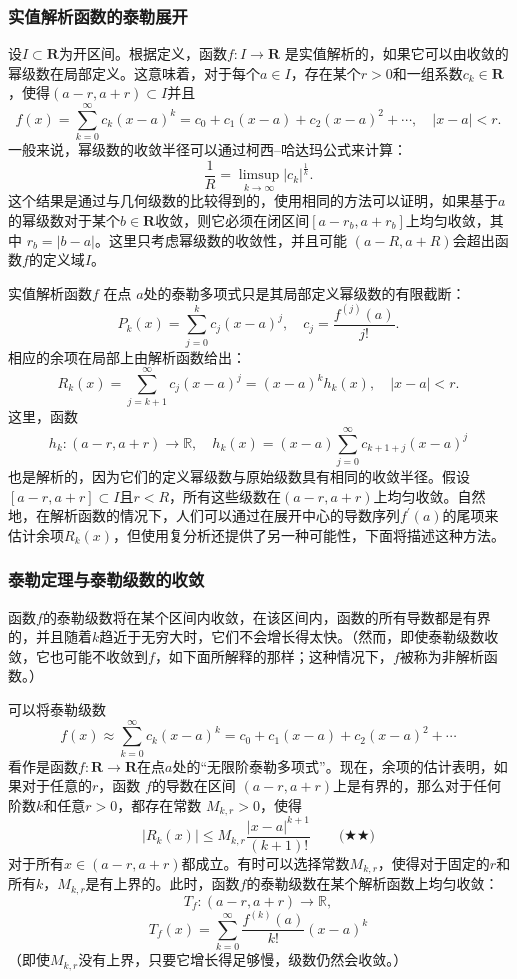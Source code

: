 \subsubsection{实值解析函数的泰勒展开}  
设\( I \subset \mathbf{R} \)为开区间。根据定义，函数\( f : I \to \mathbf{R} \) 是实值解析的，如果它可以由收敛的幂级数在局部定义。这意味着，对于每个\( a \in I \)，存在某个\( r > 0 \)和一组系数\( c_k \in \mathbf{R}\)，使得\( (a - r, a + r) \subset I \)并且
\[
f(x) = \sum_{k=0}^{\infty} c_k (x - a)^k = c_0 + c_1 (x - a) + c_2 (x - a)^2 + \cdots, \quad |x - a| < r.~
\]
一般来说，幂级数的收敛半径可以通过柯西–哈达玛公式来计算：
\[
\frac{1}{R} = \limsup_{k \to \infty} |c_k|^{\frac{1}{k}}.~
\]
这个结果是通过与几何级数的比较得到的，使用相同的方法可以证明，如果基于\( a \)的幂级数对于某个\( b \in \mathbf{R}\)收敛，则它必须在闭区间\( [a - r_b, a + r_b] \)上均匀收敛，其中 \( r_b = |b - a| \)。这里只考虑幂级数的收敛性，并且可能 \( (a - R, a + R) \)会超出函数\( f \)的定义域\( I \)。

实值解析函数\( f \) 在点 \( a \)处的泰勒多项式只是其局部定义幂级数的有限截断：
\[
P_k(x) = \sum_{j=0}^{k} c_j (x - a)^j, \quad c_j = \frac{f^{(j)}(a)}{j!}.~
\]
相应的余项在局部上由解析函数给出：
\[
R_k(x) = \sum_{j=k+1}^{\infty} c_j (x - a)^j = (x - a)^k h_k(x), \quad |x - a| < r.~
\]
这里，函数
\[
h_k : (a - r, a + r) \to \mathbb{R}, \quad h_k(x) = (x - a) \sum_{j=0}^{\infty} c_{k+1+j} (x - a)^j~
\]
也是解析的，因为它们的定义幂级数与原始级数具有相同的收敛半径。假设\( [a - r, a + r] \subset I \)且\( r < R \)，所有这些级数在\( (a - r, a + r) \)上均匀收敛。自然地，在解析函数的情况下，人们可以通过在展开中心的导数序列\( f^{'}(a) \)的尾项来估计余项\( R_k(x) \)，但使用复分析还提供了另一种可能性，下面将描述这种方法。
\subsubsection{泰勒定理与泰勒级数的收敛}  
函数\( f \)的泰勒级数将在某个区间内收敛，在该区间内，函数的所有导数都是有界的，并且随着\( k \)趋近于无穷大时，它们不会增长得太快。（然而，即使泰勒级数收敛，它也可能不收敛到\( f \)，如下面所解释的那样；这种情况下，\( f \)被称为非解析函数。）

可以将泰勒级数
\[
f(x) \approx \sum_{k=0}^{\infty} c_k (x - a)^k = c_0 + c_1 (x - a) + c_2 (x - a)^2 + \cdots~
\]
看作是函数\( f : \mathbf{R} \to \mathbf{R} \)在点\( a \)处的“无限阶泰勒多项式”。现在，余项的估计表明，如果对于任意的\( r \)，函数 \( f \)的导数在区间 \( (a - r, a + r) \)上是有界的，那么对于任何阶数\( k \)和任意\( r > 0 \)，都存在常数 \( M_{k,r} > 0 \)，使得
\[
|R_k(x)| \leq M_{k,r} \frac{|x - a|^{k+1}}{(k+1)!} \qquad \text{(★★)}~
\]
对于所有\( x \in (a - r, a + r) \)都成立。有时可以选择常数\( M_{k,r} \)，使得对于固定的\( r \)和所有\( k \)，\( M_{k,r} \)是有上界的。此时，函数\( f \)的泰勒级数在某个解析函数上均匀收敛：
\[
T_f : (a - r, a + r) \to \mathbb{R},~
\]
\[
T_f(x) = \sum_{k=0}^{\infty} \frac{f^{(k)}(a)}{k!} (x - a)^k~
\]
（即使\( M_{k,r} \)没有上界，只要它增长得足够慢，级数仍然会收敛。）

